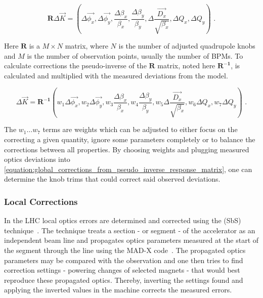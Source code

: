 \begin{equation}
  \mathbf{R} \Delta \vec{K} = \left(\Delta \overrightarrow{\phi_x}, \Delta \overrightarrow{\phi_y}, \frac{\Delta \beta_x}{\beta_x}, \frac{\Delta \beta_y}{\beta_y}, \Delta \frac{\overrightarrow{D_x}}{\sqrt{\beta_x}}, \Delta Q_x, \Delta Q_y \right) \text{ .}
  \label{equation:response_matrix}
\end{equation}

Here \(\mathbf{R}\) is a \(M \times N\) matrix, where \(N\) is the number of adjusted quadrupole knobs and \(M\) is the number of observation points, usually the number of BPMs.
To calculate corrections the pseudo-inverse of the \(\mathbf{R}\) matrix, noted here \(\mathbf{R^{-1}}\), is calculated and multiplied with the measured deviations from the model.

\begin{equation}
  \Delta \vec{K} = \mathbf{R^{-1}} \left(w_1 \Delta \overrightarrow{\phi_x}, w_2 \Delta \overrightarrow{\phi_y}, w_3 \frac{\Delta \beta_x}{\beta_x}, w_4 \frac{\Delta \beta_y}{\beta_y}, w_5 \Delta \frac{\overrightarrow{D_x}}{\sqrt{\beta_x}}, w_6 \Delta Q_x, w_7 \Delta Q_y \right) \text{ .}
  \label{equation:global_corrections_from_pseudo_inverse_response_matrix}
\end{equation}

The \(w_1 \ldots w_7\) terms are weights which can be adjusted to either focus on the correcting a given quantity, ignore some parameters completely or to balance the corrections between all properties.
By choosing weights and plugging measured optics deviations into \cref{equation:global_corrections_from_pseudo_inverse_response_matrix}, one can determine the knob trims that could correct said observed deviations.

\subsubsection*{Local Corrections}

In the LHC local optics errors are determined and corrected using the  (SbS) technique~\cite{PRAB:Tomas:CERN_LHC_OMC,PRAB:Tomas:Review_Linear_Optics_Measurements}.
The technique treats a section - or segment - of the accelerator as an independent beam line and propagates optics parameters measured at the start of the segment through the line using the MAD-X code~\cite{CODE:MADX_guide}.
The propagated optics parameters may be compared with the observation and one then tries to find correction settings - powering changes of selected magnets - that would best reproduce these propagated optics.
Thereby, inverting the settings found and applying the inverted values in the machine corrects the measured errors.

